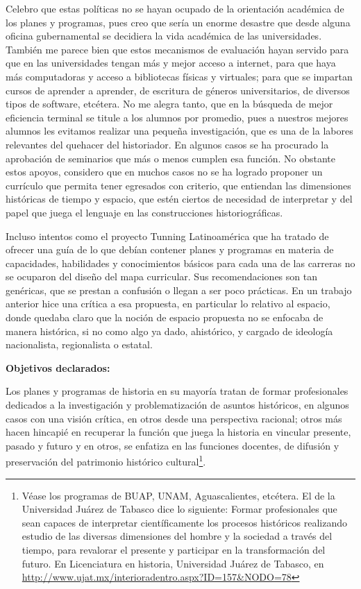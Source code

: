 Celebro que estas políticas no se hayan ocupado de la orientación 
académica de los planes y programas, pues creo que sería un enorme 
desastre que desde alguna oficina gubernamental se decidiera la vida 
académica de las universidades. También me parece bien que estos 
mecanismos de evaluación hayan servido para que en las universidades 
tengan más y mejor acceso a internet, para que haya más computadoras y 
acceso a bibliotecas físicas y virtuales; para que se impartan cursos 
de aprender a aprender, de escritura de géneros universitarios, de 
diversos tipos de software, etcétera. No me alegra tanto, que en la 
búsqueda de mejor eficiencia terminal se titule a los alumnos por 
promedio, pues a nuestros mejores alumnos les evitamos realizar una 
pequeña investigación, que es una de la labores relevantes del quehacer 
del historiador. En algunos casos se ha procurado la aprobación de 
seminarios que más o menos cumplen esa función.  No obstante estos 
apoyos, considero que en muchos casos no se ha logrado proponer un 
currículo que permita tener egresados con criterio, que entiendan las 
dimensiones históricas de tiempo y espacio, que estén ciertos de 
necesidad de interpretar y del papel que juega el lenguaje en las 
construcciones historiográficas. 

Incluso intentos como el proyecto Tunning Latinoamérica que ha tratado 
de ofrecer una guía de lo que debían contener planes y programas en 
materia de capacidades, habilidades y conocimientos básicos para cada 
una de las carreras no se ocuparon del diseño del mapa curricular. Sus 
recomendaciones son tan genéricas, que se prestan a confusión o llegan 
a ser poco prácticas. En un trabajo anterior hice una crítica a esa 
propuesta, en particular lo relativo al espacio, donde quedaba claro 
que la noción de espacio propuesta no se enfocaba de manera histórica, 
si no como algo ya dado, ahistórico, y cargado de ideología 
nacionalista, regionalista o estatal.

\textbf{  Objetivos declarados:}

Los planes y programas de historia en su mayoría tratan de formar
profesionales dedicados a la investigación y problematización de asuntos
históricos, en algunos casos con una visión crítica, en otros desde una
perspectiva racional; otros más hacen hincapié en recuperar la función que
juega la historia en vincular presente, pasado y futuro y en otros, se
enfatiza en las funciones docentes, de difusión y preservación del
patrimonio histórico cultural\footnote{Véase los programas de BUAP, UNAM,
Aguascalientes, etcétera. El de la Universidad Juárez de Tabasco dice lo
siguiente: Formar profesionales que sean capaces de interpretar
científicamente los procesos históricos realizando estudio de las diversas
dimensiones del hombre y la sociedad a través del tiempo, para revalorar el
presente y participar en la transformación del futuro. En Licenciatura en
historia, Universidad Juárez de Tabasco, en 
\url{http://www.ujat.mx/interioradentro.aspx?ID=157&NODO=78} }. 

